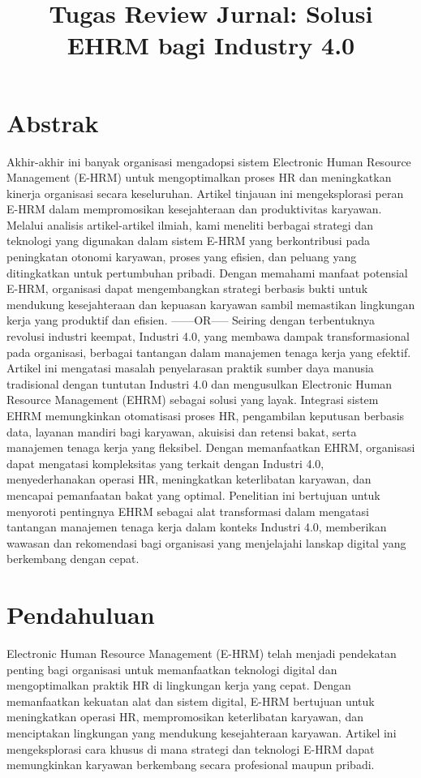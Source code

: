 \documentclass[12pt]{article}
\title{Tugas Review Jurnal: Solusi EHRM bagi Industry 4.0}
\begin{document}
\onehalfspacing
\maketitle

\section*{Abstrak}
Akhir-akhir ini banyak organisasi  mengadopsi sistem Electronic Human Resource Management (E-HRM) untuk mengoptimalkan proses HR dan meningkatkan kinerja organisasi secara keseluruhan. Artikel tinjauan ini mengeksplorasi peran E-HRM dalam mempromosikan kesejahteraan dan produktivitas karyawan. Melalui analisis artikel-artikel ilmiah, kami meneliti berbagai strategi dan teknologi yang digunakan dalam sistem E-HRM yang berkontribusi pada peningkatan otonomi karyawan, proses yang efisien, dan peluang yang ditingkatkan untuk pertumbuhan pribadi. Dengan memahami manfaat potensial E-HRM, organisasi dapat mengembangkan strategi berbasis bukti untuk mendukung kesejahteraan dan kepuasan karyawan sambil memastikan lingkungan kerja yang produktif dan efisien.
\smallbreak------OR-----
\smallbreak
Seiring dengan terbentuknya revolusi industri keempat, Industri 4.0, yang membawa dampak transformasional pada organisasi, berbagai tantangan dalam manajemen tenaga kerja yang efektif. Artikel ini mengatasi masalah penyelarasan praktik sumber daya manusia tradisional dengan tuntutan Industri 4.0 dan mengusulkan Electronic Human Resource Management (EHRM) sebagai solusi yang layak. Integrasi sistem EHRM memungkinkan otomatisasi proses HR, pengambilan keputusan berbasis data, layanan mandiri bagi karyawan, akuisisi dan retensi bakat, serta manajemen tenaga kerja yang fleksibel. Dengan memanfaatkan EHRM, organisasi dapat mengatasi kompleksitas yang terkait dengan Industri 4.0, menyederhanakan operasi HR, meningkatkan keterlibatan karyawan, dan mencapai pemanfaatan bakat yang optimal. Penelitian ini bertujuan untuk menyoroti pentingnya EHRM sebagai alat transformasi dalam mengatasi tantangan manajemen tenaga kerja dalam konteks Industri 4.0, memberikan wawasan dan rekomendasi bagi organisasi yang menjelajahi lanskap digital yang berkembang dengan cepat.

\section*{Pendahuluan}

Electronic Human Resource Management (E-HRM) telah 
menjadi pendekatan penting bagi organisasi untuk memanfaatkan 
teknologi digital dan mengoptimalkan praktik HR di lingkungan kerja yang cepat. Dengan memanfaatkan kekuatan alat dan sistem digital, E-HRM bertujuan untuk meningkatkan operasi HR, mempromosikan keterlibatan karyawan, dan menciptakan lingkungan yang mendukung kesejahteraan karyawan. Artikel ini mengeksplorasi cara khusus di mana strategi dan teknologi E-HRM dapat memungkinkan karyawan berkembang secara profesional maupun pribadi\cite{murugesan2023study}.
\end{document}

